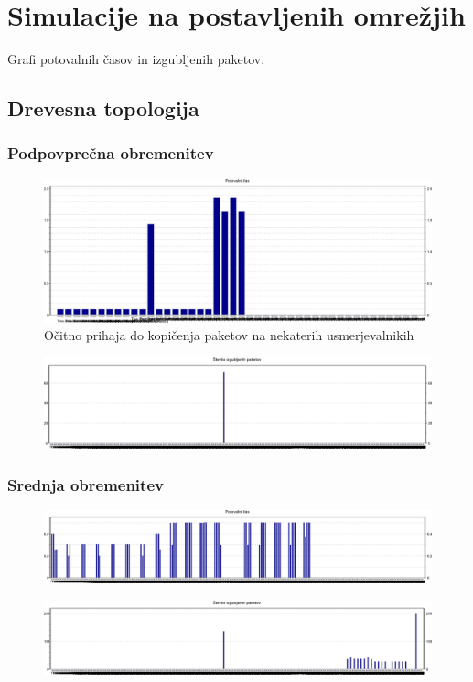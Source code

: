 \documentclass[11pt,a4paper,slovene]{myarticle}
\begin{document}
\section{Simulacije na postavljenih omrežjih}
Grafi potovalnih časov in izgubljenih paketov.
\subsection{Drevesna topologija}
\subsubsection{Podpovprečna obremenitev}
\begin{figure}[H]
\includegraphics[scale=0.45]{slike/tree/PODpotovalniCas.png}
\caption{Očitno prihaja do kopičenja paketov na nekaterih usmerjevalnikih}
\end{figure}
\begin{figure}[H]
\includegraphics[scale=0.45]{slike/tree/PODstIzgubljenihPaketov.png}
\end{figure}
\subsubsection{Srednja obremenitev}
\begin{figure}[H]
\includegraphics[scale=0.45]{slike/tree/SREpotovalniCas.png}
\end{figure}
\begin{figure}[H]
\includegraphics[scale=0.45]{slike/tree/SREstIzgubljenihPaketov.png}
\end{figure}
\end{document}
